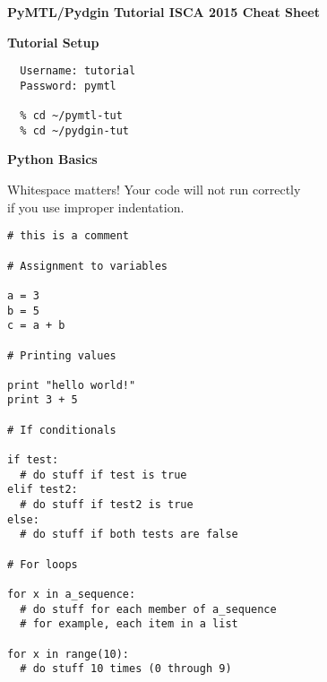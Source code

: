 \documentclass{cbxdoc}
\begin{document}
\pagestyle{empty}

\begin{landscape}
\small

\begin{center}
  \textbf{\Large PyMTL/Pydgin
    Tutorial  \hspace{0.5em}\textbullet\hspace{0.5em}
    ISCA 2015 \hspace{0.5em}\textbullet\hspace{0.5em}
    Cheat Sheet}
\end{center}

\begin{minipage}[t]{3.25in}
\vspace{0pt}

\colorbox{gray!30!white}{\parbox{1.025\tw}{\rule[-0.4em]{0pt}{1.4em}\centering\textbf{%
  Tutorial Setup%
}}}

\smallskip\smallskip
\begin{verbatim}
  Username: tutorial
  Password: pymtl

  % cd ~/pymtl-tut
  % cd ~/pydgin-tut
\end{verbatim}

\vspace{0.15in}
\colorbox{gray!30!white}{\parbox{1.025\tw}{\rule[-0.4em]{0pt}{1.4em}\centering\textbf{%
  Python Basics%
}}}

\begin{center}
Whitespace matters! Your code will not run correctly \\ if you use
improper indentation.
\end{center}

\vspace{-0.1in}
\begin{lstlisting}
# this is a comment

# Assignment to variables

a = 3
b = 5
c = a + b

# Printing values

print "hello world!"
print 3 + 5

# If conditionals

if test:
  # do stuff if test is true
elif test2:
  # do stuff if test2 is true
else:
  # do stuff if both tests are false

# For loops

for x in a_sequence:
  # do stuff for each member of a_sequence
  # for example, each item in a list

for x in range(10):
  # do stuff 10 times (0 through 9)


\end{lstlisting}
\end{minipage}
\end{landscape}
\end{document}
